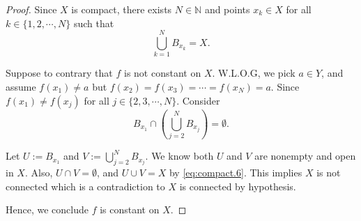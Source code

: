 \begin{Exercise}
\begin{proof}
Since $X$ is compact, there exists $N\in\mathbb{N}$ and points $x_k\in X$ for all $k\in\{1,2,\cdots,N\}$ such that
\begin{equation}\label{eq:compact.6}
\bigcup_{k=1}^{N} B_{x_k} = X.
\end{equation}

Suppose to contrary that $f$ is not constant on $X$. W.L.O.G, we pick $a\in Y$, and assume $f(x_1) \neq a$ but $f(x_2) = f(x_3) = \cdots = f(x_N) = a$.
Since $f(x_1) \neq f(x_j)$ for all $j\in\{2,3,\cdots,N\}$. Consider
$$
B_{x_1}\cap \left( \bigcup_{j=2}^{N} B_{x_j} \right) = \emptyset.
$$

Let $U := B_{x_1}$ and $V := \bigcup_{j=2}^{N} B_{x_j}$. We know both $U$ and $V$ are nonempty and open in $X$. Also, $U\cap V=\emptyset$, and $U\cup V = X$ by \eqref{eq:compact.6}. This implies $X$ is not connected which is a contradiction to $X$ is connected by hypothesis.

Hence, we conclude $f$ is constant on $X$.
\end{proof}
\end{Exercise}